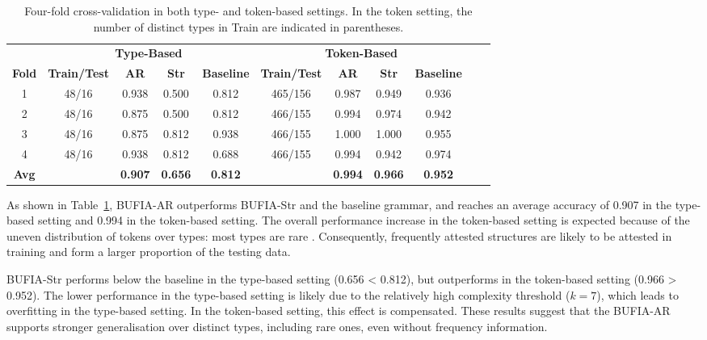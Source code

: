 \begin{table}
	\centering
	\setlength{\tabcolsep}{4pt}
	\begin{tabular}{ccccccccccc}
		\toprule
		& \multicolumn{4}{c}{\textbf{Type-Based}} & \multicolumn{4}{c}{\textbf{Token-Based}} \\
		\cmidrule(lr){2-5} \cmidrule(lr){6-9}
		\textbf{Fold} 
		& \textbf{Train/Test}
		& \textbf{AR} & \textbf{Str} & \textbf{Baseline}
		& \textbf{Train/Test}
		& \textbf{AR} & \textbf{Str} & \textbf{Baseline} \\
		\midrule
		
		1 & 48/16 
		& 0.938 & 0.500 & 0.812
		& 465/156 
		& 0.987 & 0.949 & 0.936 \\
		
		2 & 48/16 
		& 0.875 & 0.500 & 0.812
		& 466/155
		& 0.994 & 0.974 & 0.942 \\
		
		3 & 48/16 
		& 0.875 & 0.812 & 0.938
		& 466/155
		& 1.000 & 1.000 & 0.955 \\
		
		4 & 48/16 
		& 0.938 & 0.812 & 0.688
		& 466/155
		& 0.994 & 0.942 & 0.974 \\
		
		\midrule
		\textbf{Avg} 
		& 
		& \textbf{0.907} & \textbf{0.656} & \textbf{0.812}
		& 
		& \textbf{0.994} & \textbf{0.966} & \textbf{0.952} \\
		
		\bottomrule
	\end{tabular}
	\caption{Four-fold cross-validation in both type- and token-based settings. In the token setting, the number of distinct types in Train are indicated in parentheses.}
	\label{sec4.tab.crosvalid}
\end{table}


As shown in Table~\ref{sec4.tab.crosvalid}, BUFIA-AR outperforms
BUFIA-Str and the baseline grammar, and reaches an average accuracy of 0.907 
in the type-based setting and 0.994 in the token-based setting. 
The overall performance increase in the token-based setting is expected because of the uneven distribution of tokens over types: most types are rare \citep{Yang2013}. Consequently, frequently attested structures are likely to be attested in training and form a larger proportion of the testing data.

BUFIA-Str performs below the baseline in the type-based 
setting (0.656 < 0.812), but outperforms in the token-based setting 
(0.966 > 0.952). The lower performance in the 
type-based setting is likely due to the relatively high complexity 
threshold ($k=7$), which leads to overfitting in the type-based setting.
In the token-based setting, this effect is compensated.
These results suggest that the BUFIA-AR supports 
stronger generalisation over distinct types, including rare ones,
even without frequency information.

